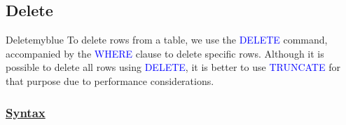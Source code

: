 
\subsection{Delete} 

\begin{prettyBox}{Delete}{myblue}
To delete rows from a table, we use the \textcolor{blue}{DELETE} command, accompanied by the \textcolor{blue}{WHERE} clause to delete specific rows. Although it is possible to delete all rows using \textcolor{blue}{DELETE}, it is better to use \textcolor{blue}{TRUNCATE} for that purpose due to performance considerations.
\end{prettyBox}

\subsubsection*{\underline{\textbf{Syntax}}}


